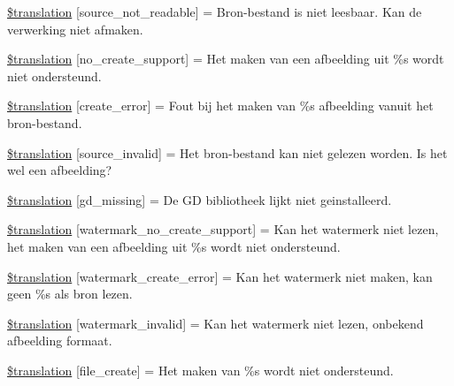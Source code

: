 \begin{DoxyCompactItemize}
\hyperlink{class_8upload_8nl___n_l_8php_a922967ca2df0efdd455261142d8e5715}{\$translation} \mbox{[}\textquotesingle{}source\+\_\+not\+\_\+readable\textquotesingle{}\mbox{]} = \textquotesingle{}Bron-\/bestand is niet leesbaar. Kan de verwerking niet afmaken.\textquotesingle{}
\item 
\hyperlink{class_8upload_8nl___n_l_8php_a346dfd1ade29f583dd20d345c436859f}{\$translation} \mbox{[}\textquotesingle{}no\+\_\+create\+\_\+support\textquotesingle{}\mbox{]} = \textquotesingle{}Het maken van een afbeelding uit \%s wordt niet ondersteund.\textquotesingle{}
\item 
\hyperlink{class_8upload_8nl___n_l_8php_a53013ce9255c4e1849098ddd9fdb2b3f}{\$translation} \mbox{[}\textquotesingle{}create\+\_\+error\textquotesingle{}\mbox{]} = \textquotesingle{}Fout bij het maken van \%s afbeelding vanuit het bron-\/bestand.\textquotesingle{}
\item 
\hyperlink{class_8upload_8nl___n_l_8php_a6ab0a660b457eaf2d3434b225449fdd6}{\$translation} \mbox{[}\textquotesingle{}source\+\_\+invalid\textquotesingle{}\mbox{]} = \textquotesingle{}Het bron-\/bestand kan niet gelezen worden. Is het wel een afbeelding?\textquotesingle{}
\item 
\hyperlink{class_8upload_8nl___n_l_8php_a7f3dfcc0db4bbc0f2e7210c439798e56}{\$translation} \mbox{[}\textquotesingle{}gd\+\_\+missing\textquotesingle{}\mbox{]} = \textquotesingle{}De G\+D bibliotheek lijkt niet geinstalleerd.\textquotesingle{}
\item 
\hyperlink{class_8upload_8nl___n_l_8php_a82d5853430ab72dc1f9799ec36144cc6}{\$translation} \mbox{[}\textquotesingle{}watermark\+\_\+no\+\_\+create\+\_\+support\textquotesingle{}\mbox{]} = \textquotesingle{}Kan het watermerk niet lezen, het maken van een afbeelding uit \%s wordt niet ondersteund.\textquotesingle{}
\item 
\hyperlink{class_8upload_8nl___n_l_8php_aabca0b65dadbc6184415c16375f284ca}{\$translation} \mbox{[}\textquotesingle{}watermark\+\_\+create\+\_\+error\textquotesingle{}\mbox{]} = \textquotesingle{}Kan het watermerk niet maken, kan geen \%s als bron lezen.\textquotesingle{}
\item 
\hyperlink{class_8upload_8nl___n_l_8php_ac336e7a5701e47ba4a05e9e498a3cc44}{\$translation} \mbox{[}\textquotesingle{}watermark\+\_\+invalid\textquotesingle{}\mbox{]} = \textquotesingle{}Kan het watermerk niet lezen, onbekend afbeelding formaat.\textquotesingle{}
\item 
\hyperlink{class_8upload_8nl___n_l_8php_a1ecb4673e4fb69e06b3f20b65cecf30a}{\$translation} \mbox{[}\textquotesingle{}file\+\_\+create\textquotesingle{}\mbox{]} = \textquotesingle{}Het maken van \%s wordt niet ondersteund.\textquotesingle{}

\end{DoxyCompactItemize}
